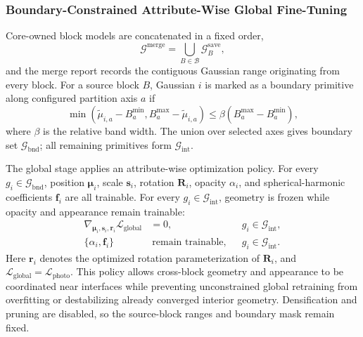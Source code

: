 \documentclass[conference]{IEEEtran}
\begin{document}
\subsubsection{Boundary-Constrained Attribute-Wise Global Fine-Tuning}

Core-owned block models are concatenated in a fixed order,
\begin{equation}
\mathcal{G}^{\mathrm{merge}}=\bigcup_{B\in\mathcal{B}}\mathcal{G}^{\mathrm{save}}_B,
\label{eq:merge}
\end{equation}
and the merge report records the contiguous Gaussian range originating from every block. For a source block $B$, Gaussian $i$ is marked as a boundary primitive along configured partition axis $a$ if
\begin{equation}
\min(\tilde{\mu}_{i,a}-B_a^{\min},B_a^{\max}-\tilde{\mu}_{i,a})
\leq\beta(B_a^{\max}-B_a^{\min}),
\label{eq:boundarymask}
\end{equation}
where $\beta$ is the relative band width. The union over selected axes gives boundary set $\mathcal{G}_{\mathrm{bnd}}$; all remaining primitives form $\mathcal{G}_{\mathrm{int}}$.

The global stage applies an attribute-wise optimization policy. For every $g_i\in\mathcal{G}_{\mathrm{bnd}}$, position $\boldsymbol{\mu}_i$, scale $\mathbf{s}_i$, rotation $\mathbf{R}_i$, opacity $\alpha_i$, and spherical-harmonic coefficients $\mathbf{f}_i$ are all trainable. For every $g_i\in\mathcal{G}_{\mathrm{int}}$, geometry is frozen while opacity and appearance remain trainable:
\begin{align}
\nabla_{\boldsymbol{\mu}_i,\mathbf{s}_i,\mathbf{r}_i}\mathcal{L}_{\mathrm{global}}&=0,
&&g_i\in\mathcal{G}_{\mathrm{int}},\label{eq:interiorfreeze}\\
\{\alpha_i,\mathbf{f}_i\}&\ \text{remain trainable},
&&g_i\in\mathcal{G}_{\mathrm{int}}.
\label{eq:interiorappearance}
\end{align}
Here $\mathbf{r}_i$ denotes the optimized rotation parameterization of $\mathbf{R}_i$, and $\mathcal{L}_{\mathrm{global}}=\mathcal{L}_{\mathrm{photo}}$. This policy allows cross-block geometry and appearance to be coordinated near interfaces while preventing unconstrained global retraining from overfitting or destabilizing already converged interior geometry. Densification and pruning are disabled, so the source-block ranges and boundary mask remain fixed.
\end{document}
